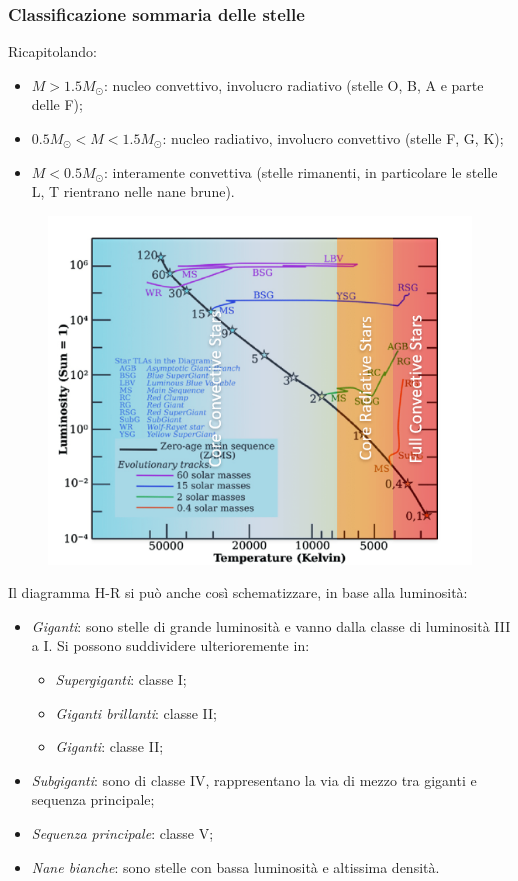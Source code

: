 \documentclass[a4paper,11pt]{article}
\begin{document}
\subsubsection{Classificazione sommaria delle stelle}
Ricapitolando: 
\begin{itemize}
    \item $M>1.5 M_{\odot}$: nucleo convettivo, involucro radiativo (stelle O, B, A e parte delle F);
    \item $0.5M_{\odot}<M<1.5 M_{\odot}$: nucleo radiativo, involucro convettivo (stelle F, G, K);
    \item $M<0.5 M_{\odot}$: interamente convettiva (stelle rimanenti, in particolare le stelle L, T rientrano nelle nane brune).
\end{itemize}
\begin{figure}[h!]
    \centering
    \includegraphics[scale=0.8]{hr_core.png}
    \label{fig:my_label}
\end{figure}
Il diagramma H-R si può anche così schematizzare, in base alla luminosità:
\begin{itemize}
    \item \textit{Giganti}: sono stelle di grande luminosità e vanno dalla classe di luminosità III a I. Si possono suddividere ulterioremente in:
    \begin{itemize}
        \item \textit{Supergiganti}: classe I;
        \item \textit{Giganti brillanti}: classe II;
        \item \textit{Giganti}: classe II;
    \end{itemize}
    \item \textit{Subgiganti}: sono di classe IV, rappresentano la via di mezzo tra giganti e sequenza principale;
    \item \textit{Sequenza principale}: classe V;
    \item \textit{Nane bianche}: sono stelle con bassa luminosità e altissima densità.
\end{itemize}
\end{document}
